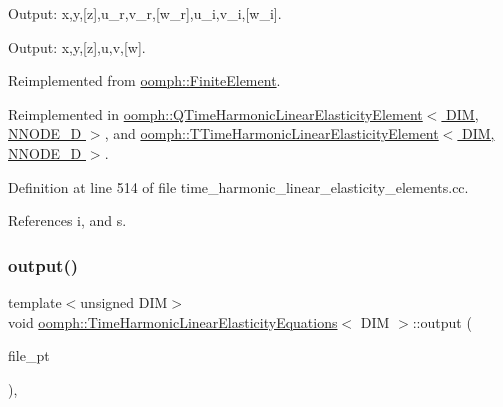 Output\+: x,y,\mbox{[}z\mbox{]},u\+\_\+r,v\+\_\+r,\mbox{[}w\+\_\+r\mbox{]},u\+\_\+i,v\+\_\+i,\mbox{[}w\+\_\+i\mbox{]}. 

Output\+: x,y,\mbox{[}z\mbox{]},u,v,\mbox{[}w\mbox{]}. 

Reimplemented from \hyperlink{classoomph_1_1FiniteElement_afa9d9b2670f999b43e6679c9dd28c457}{oomph\+::\+Finite\+Element}.



Reimplemented in \hyperlink{classoomph_1_1QTimeHarmonicLinearElasticityElement_a7429278e0a38d0b934b574f421ea54c3}{oomph\+::\+Q\+Time\+Harmonic\+Linear\+Elasticity\+Element$<$ D\+I\+M, N\+N\+O\+D\+E\+\_\+D $>$}, and \hyperlink{classoomph_1_1TTimeHarmonicLinearElasticityElement_a6a11b59f4e32f9ce2bc7326dff35d8fb}{oomph\+::\+T\+Time\+Harmonic\+Linear\+Elasticity\+Element$<$ D\+I\+M, N\+N\+O\+D\+E\+\_\+D $>$}.



Definition at line 514 of file time\+\_\+harmonic\+\_\+linear\+\_\+elasticity\+\_\+elements.\+cc.



References i, and s.

\mbox{\label{classoomph_1_1TimeHarmonicLinearElasticityEquations_ab92581333fed6fcfd5267e3136c445c3}} 
\subsubsection{\texorpdfstring{output()}{output()}\hspace{0.1cm}{\footnotesize\ttfamily [3/4]}}
{\footnotesize\ttfamily template$<$unsigned D\+IM$>$ \\
void \hyperlink{classoomph_1_1TimeHarmonicLinearElasticityEquations}{oomph\+::\+Time\+Harmonic\+Linear\+Elasticity\+Equations}$<$ D\+IM $>$\+::output (\begin{DoxyParamCaption}\item[{F\+I\+LE $\ast$}]{file\+\_\+pt }\end{DoxyParamCaption})\hspace{0.3cm}{\ttfamily [inline]}, {\ttfamily [virtual]}}



